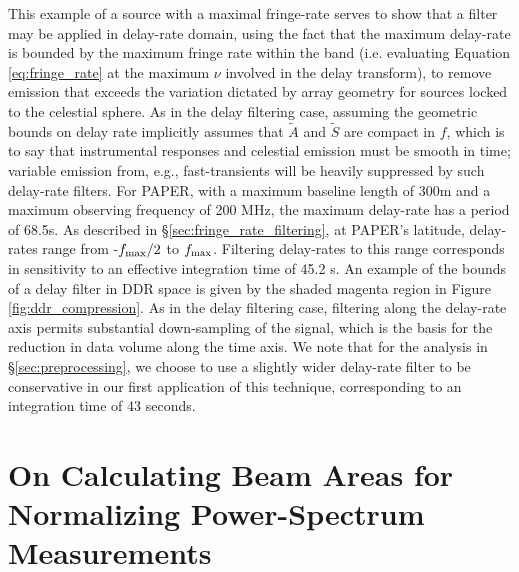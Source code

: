 \documentclass[twocolumn,numberedappendix]{emulateapj}
\def\At{\tilde{A}}
\begin{document}
This example of a source with a maximal fringe-rate serves to show that a 
filter may be applied in delay-rate domain, using the fact that the maximum
delay-rate is bounded by the maximum fringe rate within the band (i.e. evaluating Equation \ref{eq:fringe_rate}
at the maximum $\nu$ involved in the delay transform), to remove emission that exceeds the variation
dictated by array geometry for sources locked to the celestial sphere.  As in the delay filtering case, assuming
the geometric bounds on delay rate implicitly assumes that $\At$ and $\tilde{S}$ are compact in $f$, which
is to say that instrumental responses and celestial emission must be smooth in time; variable
emission from, e.g., fast-transients will be heavily suppressed by such delay-rate filters.
For PAPER, with a maximum baseline length of 300m and a maximum observing frequency of 200 MHz, 
the maximum delay-rate has a period of 68.5s.  As described in \S\ref{sec:fringe_rate_filtering}, at PAPER's
latitude, delay-rates range from -$f_{\rm max}/2$ to $f_{\rm max}$.  Filtering delay-rates to this
range corresponds in sensitivity to an effective integration time of 45.2 s.
An example of the bounds of a delay filter in DDR space is given
by the shaded magenta region in Figure \ref{fig:ddr_compression}.  As in the delay filtering case,
filtering along the delay-rate axis permits substantial down-sampling of the signal, which is
the basis for the reduction in data volume along the time axis.
We note that for the analysis
in \S\ref{sec:preprocessing}, we choose to use a slightly wider delay-rate filter to be conservative in
our first application of this technique, corresponding to an integration time of 43 seconds.

\section{On Calculating Beam Areas for Normalizing Power-Spectrum Measurements}
\label{app:beam_area}
\end{document}
